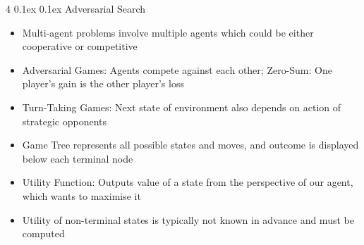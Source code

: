 \documentclass[10pt, landscape]{article}
\makeatletter
\renewcommand{\subsection}{\@startsection{subsection}{2}{0mm}%
  {0.1ex} %
  {0.1ex} %
  {\normalfont\normalsize\bfseries}}
\makeatother
\begin{document}
\begin{multicols*}{4}
\subsection{Adversarial Search}
\begin{itemize}
    \item Multi-agent problems involve multiple agents which could be either cooperative or competitive
    \item Adversarial Games: Agents compete against each other; Zero-Sum: One player's gain is the other player's loss
    \item Turn-Taking Games: Next state of environment also depends on action of strategic opponents
    \item Game Tree represents all possible states and moves, and outcome is displayed below each terminal node
    \item Utility Function: Outputs value of a state from the perspective of our agent, which wants to maximise it
    \item Utility of non-terminal states is typically not known in advance and must be computed
\end{itemize}


\end{multicols*}
\end{document}
